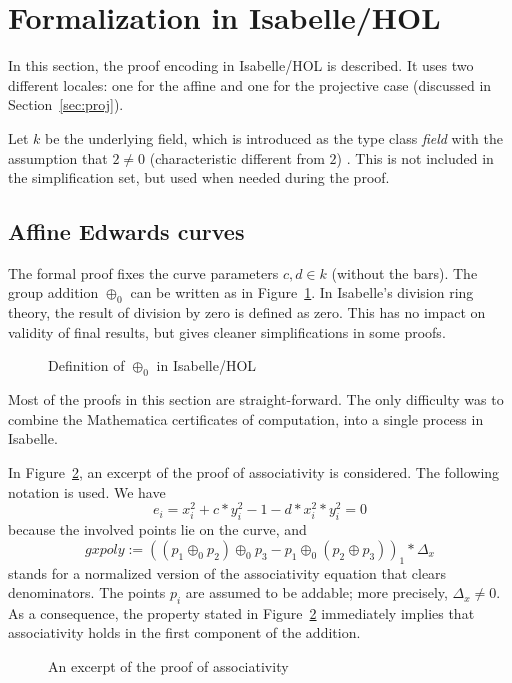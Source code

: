 \documentclass{llncs}
\begin{document}
\section{Formalization in Isabelle/HOL}

In this section, the proof encoding in Isabelle/HOL is described. It
uses two different locales: one for the affine and one for the
projective case (discussed in Section~\ref{sec:proj}).

Let $k$ be the underlying field, which is introduced as the type
class \textit{field} with the assumption that $2 \neq 0$
(characteristic different from $2$)
\cite{Elliptic_Curves_Group_Law-AFP}. This is not included in the
simplification set, but used when needed during the proof.

\subsection{Affine Edwards curves}

The formal proof fixes the curve parameters $c,d \in k$ (without the bars). The group
addition $\oplus_0$ 
can be written as in Figure~\ref{fig:1}. 
In Isabelle's division ring theory, the result of division by zero is
defined as zero. This has no impact on validity of final results, but gives cleaner
simplifications in some proofs.

\begin{figure}
	{}
	\caption{Definition of $\oplus_0$ in Isabelle/HOL}
	\label{fig:1}
\end{figure}

Most of the proofs in this section are straight-forward. The only
difficulty was to combine the Mathematica certificates of computation, 
into a single process in Isabelle.

In Figure~\ref{fig:2}, an excerpt of the proof of associativity is
considered. The following notation is used.  We have
\[
e_i = x_i^2 + c * y_i^2 - 1 - d * x_i^2 * y_i^2 = 0
\]
because the involved points lie on the curve, and
\[
\textit{gxpoly} := ((p_1\oplus_0 p_2) \oplus_0 p_3 - p_1 \oplus_0 (p_2 \oplus
p_3))_1*\Delta_x
\]
stands for a normalized version of the associativity equation that
clears denominators. The points $p_i$ are assumed to be
addable; more precisely, $\Delta_x \neq 0$. As a consequence, the property stated in
Figure~\ref{fig:2} immediately implies that associativity holds in the first
component of the addition.


\begin{figure}
	{}
	\caption{An excerpt of the proof of associativity}
	\label{fig:2}
\end{figure}
\end{document}
